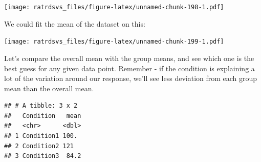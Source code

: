 \documentclass[
]{book}
\newenvironment{Shaded}{\begin{snugshade}}{\end{snugshade}}
\newcommand{\DataTypeTok}[1]{\textcolor[rgb]{0.13,0.29,0.53}{#1}}
\newcommand{\KeywordTok}[1]{\textcolor[rgb]{0.13,0.29,0.53}{\textbf{#1}}}
\newcommand{\NormalTok}[1]{#1}
\newcommand{\OperatorTok}[1]{\textcolor[rgb]{0.81,0.36,0.00}{\textbf{#1}}}
\newcommand{\StringTok}[1]{\textcolor[rgb]{0.31,0.60,0.02}{#1}}
\begin{document}
\texttt{[image: ratrdsvs\_files/figure-latex/unnamed-chunk-198-1.pdf]}

We could fit the mean of the dataset on this:

\begin{Shaded}
\end{Shaded}

\texttt{[image: ratrdsvs\_files/figure-latex/unnamed-chunk-199-1.pdf]}

Let's compare the overall mean with the group means, and see which one is the best guess for any given data point. Remember - if the condition is explaining a lot of the variation around our response, we'll see less deviation from each group mean than the overall mean.

\begin{Shaded}
\end{Shaded}

\begin{verbatim}
## # A tibble: 3 x 2
##   Condition   mean
##   <chr>      <dbl>
## 1 Condition1 100. 
## 2 Condition2 121  
## 3 Condition3  84.2
\end{verbatim}
\end{document}
